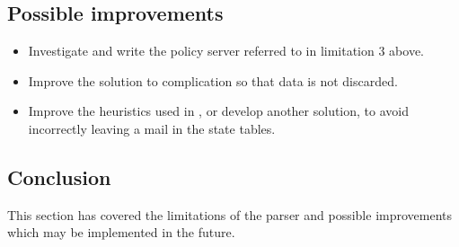 \subsection{Possible improvements}

\begin{itemize}

    \item Investigate and write the policy server referred to in limitation
        3 above.

    \item Improve the solution to complication  so that data is not discarded.

    \item Improve the heuristics used in
        , or develop another
        solution, to avoid incorrectly leaving a mail in the state tables.

\end{itemize}

\subsection{Conclusion}

This section has covered the limitations of the parser and possible
improvements which may be implemented in the future.


